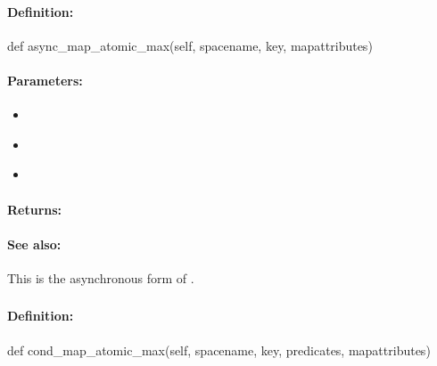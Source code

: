 \paragraph{Definition:}
\begin{pythoncode}
def async_map_atomic_max(self, spacename, key, mapattributes)
\end{pythoncode}

\paragraph{Parameters:}
\begin{itemize}[noitemsep]
\item {}\\

\item {}\\

\item {}\\

\end{itemize}

\paragraph{Returns:}


\paragraph{See also:}  This is the asynchronous form of .

\pagebreak
\subsubsection{}
\label{api:python:cond_map_atomic_max}


\paragraph{Definition:}
\begin{pythoncode}
def cond_map_atomic_max(self, spacename, key, predicates, mapattributes)
\end{pythoncode}

